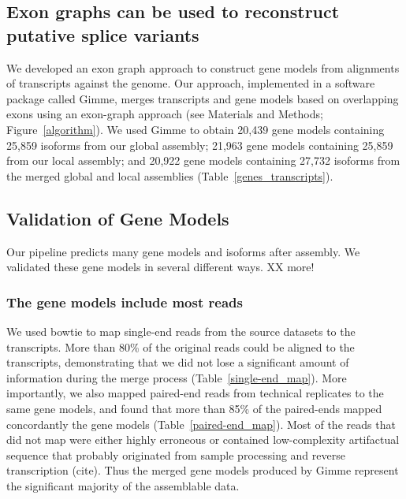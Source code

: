 \documentclass[10pt]{article}
\begin{document}

\subsection*{Exon graphs can be used to reconstruct putative splice variants}

We developed an exon graph approach to construct gene models from
alignments of transcripts against the genome.  Our approach,
implemented in a software package called Gimme, merges transcripts and
gene models based on overlapping exons using an exon-graph approach
(see Materials and Methods; Figure~\ref{algorithm}).  We used Gimme to obtain
20,439 gene models containing 25,859 isoforms from our global
assembly; 21,963 gene models containing 25,859 from our local
assembly; and 20,922 gene models containing 27,732 isoforms from the
merged global and local assemblies (Table~\ref{genes_transcripts}).


\subsection*{Validation of Gene Models}

Our pipeline predicts many gene models and isoforms after assembly.
We validated these gene models in several different ways.  XX more!


\subsubsection*{The gene models include most reads}

We used bowtie to map single-end reads from the source datasets to the
transcripts.  More than 80\% of the original reads could be aligned to
the transcripts, demonstrating that we did not lose a significant
amount of information during the merge process
(Table~\ref{single-end_map}).  More importantly, we also mapped
paired-end reads from technical replicates to the same gene models,
and found that more than 85\% of the paired-ends mapped concordantly
the gene models (Table~\ref{paired-end_map}).  Most of the reads that
did not map were either highly erroneous or contained low-complexity
artifactual sequence that probably originated from sample processing
and reverse transcription (cite).
Thus the merged gene models produced by Gimme represent the significant
majority of the assemblable data.
\end{document}
